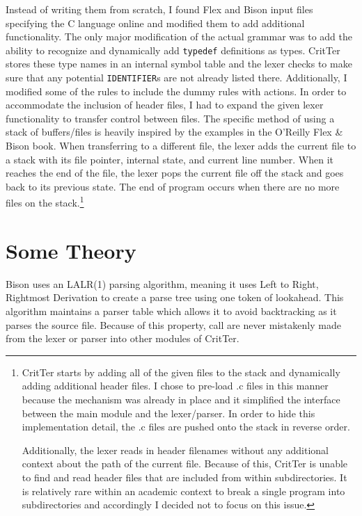 \documentclass[12pt]{report}
\newcommand{\programName}{CritTer\xspace}
\begin{document}
Instead of writing them from scratch, I found Flex and Bison input files specifying the C language
online\cite{originalGrammar} and modified them to add additional functionality. The only major 
modification of the actual grammar was to add the ability to recognize and dynamically add 
\lstinline{typedef} definitions as types. \programName stores these type names in an internal symbol 
table and the lexer checks to make sure that any potential \lstinline{IDENTIFIER}s are not already listed 
there. Additionally, I modified some of the rules to include the dummy rules with actions. In 
order to accommodate the inclusion of header files, I had to expand the given lexer functionality to 
transfer control between files. The specific method of using a stack of buffers\slash files is heavily 
inspired by the examples in the O'Reilly Flex \& Bison book\cite{flex-and-bison}. When transferring to a 
different file, the lexer adds the current file to a stack with its file pointer, internal state, and current line 
number. When it reaches the end of the file, the lexer pops the current file off the stack and goes back 
to its previous state. The end of program occurs when there are no more files on the 
stack.\footnote{\programName starts by adding all of the given files to the stack and dynamically adding 
additional header files. I chose to pre-load .c files in this manner because the mechanism was already in 
place and it simplified the interface between the main module and the lexer\slash parser. In order to hide 
this implementation detail, the .c files are pushed onto the stack in reverse order.

Additionally, the lexer reads in header filenames without any additional context about the path of the 
current file. Because of this, \programName is unable to find and read header files that are included from 
within subdirectories. It is relatively rare within an academic context to break a single program into 
subdirectories and accordingly I decided not to focus on this issue.} 

\section{Some Theory}
Bison uses an LALR(1) parsing algorithm, meaning it uses Left to Right, Rightmost Derivation to create a 
parse tree using one token of lookahead. This algorithm maintains a parser table which allows it to avoid 
backtracking as it parses the source file. Because of this property, call are never mistakenly made from 
the lexer or parser into other modules of \programName.
\end{document}
